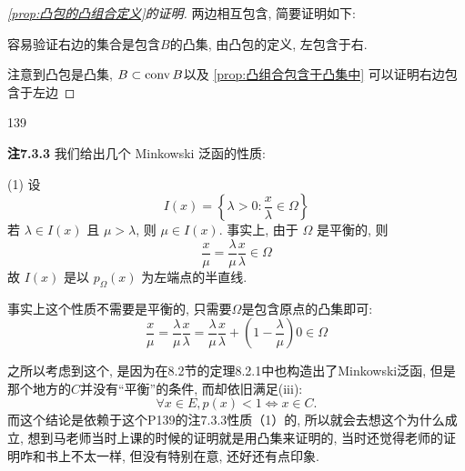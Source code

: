     \begin{proof}[\autoref{prop:凸包的凸组合定义}的证明]
        两边相互包含, 简要证明如下:

        容易验证右边的集合是包含$B$的凸集, 由凸包的定义, 左包含于右.

        注意到凸包是凸集, $B\subset \operatorname{conv}B$以及 \autoref{prop:凸组合包含于凸集中} 可以证明右边包含于左边
    \end{proof}
    \begin{detail}{139}{\textbf{注7.3.3} 我们给出几个 Minkowski 泛函的性质:

        (1) 设
        \[
        I(x)=\left\{\lambda>0: \frac{x}{\lambda} \in \Omega\right\}
        \]
        若 $\lambda \in I(x)$ 且 $\mu>\lambda$, 则 $\mu \in I(x)$. 事实上, 由于 $\Omega$ 是平衡的, 则
        \[
        \frac{x}{\mu}=\frac{\lambda}{\mu} \frac{x}{\lambda} \in \Omega
        \]
        故 $I(x)$ 是以 $p_{\Omega}(x)$ 为左端点的半直线.}
        事实上这个性质不需要是平衡的, 只需要$\Omega$是包含原点的凸集即可:
        \[
        \frac{x}{\mu}=\frac{\lambda}{\mu} \frac{x}{\lambda} =\frac{\lambda}{\mu} \frac{x}{\lambda} + \left(1-\frac{\lambda}{\mu}\right)0 \in \Omega
        \]
        \begin{remark}
            之所以考虑到这个, 是因为在8.2节的定理8.2.1中也构造出了Minkowski泛函, 但是那个地方的$C$并没有“平衡”的条件, 而却依旧满足(iii):
            \[ \forall x \in E, p(x)<1 \Leftrightarrow x \in C.\]
            而这个结论是依赖于这个P139的注7.3.3性质（1）的, 所以就会去想这个为什么成立, 想到马老师当时上课的时候的证明就是用凸集来证明的, 当时还觉得老师的证明咋和书上不太一样, 但没有特别在意, 还好还有点印象.
        \end{remark}
        
    \end{detail}